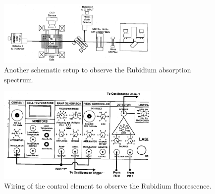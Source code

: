 \begin{figure}
  \centering
  \includegraphics[width=0.7\textwidth]{setup3.png}
  \caption{Another schematic setup to observe the Rubidium absorption spectrum.\cite{V61}}
  \label{fig:setup3}
\end{figure}


\begin{figure}
  \centering
  \includegraphics[width=0.7\textwidth]{wiring2.png}
  \caption{Wiring of the control element to observe the Rubidium fluorescence.\cite{V61}}
  \label{fig:dl_controll2}
\end{figure}
